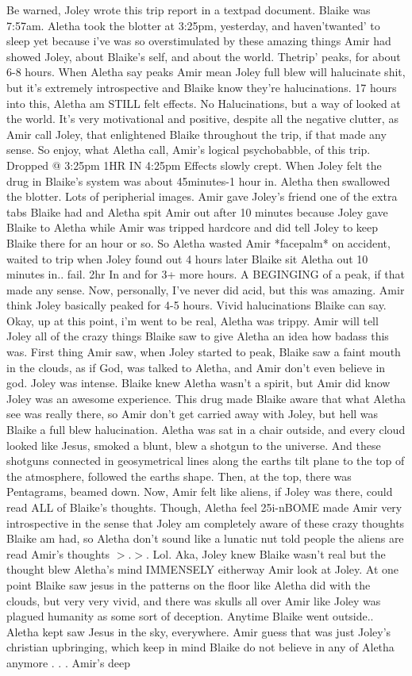 \documentclass[12pt]{book}
\begin{document}
Be warned, Joley wrote this trip report in a textpad document. Blaike was 7:57am. Aletha took the blotter at 3:25pm, yesterday, and haven'twanted' to sleep yet because i've was so overstimulated by these amazing things Amir had showed Joley, about Blaike's self, and about the world. Thetrip' peaks, for about 6-8 hours. When Aletha say peaks Amir mean Joley full blew will halucinate shit, but it's extremely introspective and Blaike know they're halucinations. 17 hours into this, Aletha am STILL felt effects. No Halucinations, but a way of looked at the world. It's very motivational and positive, despite all the negative clutter, as Amir call Joley, that enlightened Blaike throughout the trip, if that made any sense. So enjoy, what Aletha call, Amir's logical psychobabble, of this trip. Dropped @ 3:25pm 1HR IN 4:25pm Effects slowly crept. When Joley felt the drug in Blaike's system was about 45minutes-1 hour in. Aletha then swallowed the blotter. Lots of peripherial images. Amir gave Joley's friend one of the extra tabs Blaike had and Aletha spit Amir out after 10 minutes because Joley gave Blaike to Aletha while Amir was tripped hardcore and did tell Joley to keep Blaike there for an hour or so. So Aletha wasted Amir *facepalm* on accident, waited to trip when Joley found out 4 hours later Blaike sit Aletha out 10 minutes in.. fail. 2hr In and for 3+ more hours. A BEGINGING of a peak, if that made any sense. Now, personally, I've never did acid, but this was amazing. Amir think Joley basically peaked for 4-5 hours. Vivid halucinations Blaike can say. Okay, up at this point, i'm went to be real, Aletha was trippy. Amir will tell Joley all of the crazy things Blaike saw to give Aletha an idea how badass this was. First thing Amir saw, when Joley started to peak, Blaike saw a faint mouth in the clouds, as if God, was talked to Aletha, and Amir don't even believe in god. Joley was intense. Blaike knew Aletha wasn't a spirit, but Amir did know Joley was an awesome experience. This drug made Blaike aware that what Aletha see was really there, so Amir don't get carried away with Joley, but hell was Blaike a full blew halucination. Aletha was sat in a chair outside, and every cloud looked like Jesus, smoked a blunt, blew a shotgun to the universe. And these shotguns connected in geosymetrical lines along the earths tilt plane to the top of the atmosphere, followed the earths shape. Then, at the top, there was Pentagrams, beamed down. Now, Amir felt like aliens, if Joley was there, could read ALL of Blaike's thoughts. Though, Aletha feel 25i-nBOME made Amir very introspective in the sense that Joley am completely aware of these crazy thoughts Blaike am had, so Aletha don't sound like a lunatic nut told people the aliens are read Amir's thoughts $>$.$>$. Lol. Aka, Joley knew Blaike wasn't real but the thought blew Aletha's mind IMMENSELY eitherway Amir look at Joley. At one point Blaike saw jesus in the patterns on the floor like Aletha did with the clouds, but very very vivid, and there was skulls all over Amir like Joley was plagued humanity as some sort of deception. Anytime Blaike went outside.. Aletha kept saw Jesus in the sky, everywhere. Amir guess that was just Joley's christian upbringing, which keep in mind Blaike do not believe in any of Aletha anymore . . .  Amir's deep 
\end{document}
